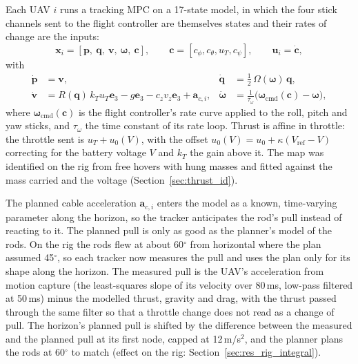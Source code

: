 Each UAV $i$ runs a tracking MPC on a 17-state model, in which the four stick channels sent to the
flight controller are themselves states and their rates of change are the inputs:
\begin{equation}
    \mathbf{x}_i = [\mathbf{p},\ \mathbf{q},\ \mathbf{v},\ \boldsymbol{\omega},\ \mathbf{c}], \qquad
    \mathbf{c} = [c_\phi, c_\theta, u_T, c_\psi], \qquad \mathbf{u}_i = \dot{\mathbf{c}},
\end{equation}
with
\begin{align}
    \dot{\mathbf{p}} &= \mathbf{v}, &
    \dot{\mathbf{q}} &= \tfrac{1}{2}\, \Omega(\boldsymbol{\omega})\, \mathbf{q}, \\
    \dot{\mathbf{v}} &= R(\mathbf{q})\, k_T u_T \mathbf{e}_3 - g\mathbf{e}_3 - c_z v_z \mathbf{e}_3 + \mathbf{a}_{c,i}, &
    \dot{\boldsymbol{\omega}} &= \frac{1}{\tau_\omega}\big(\boldsymbol{\omega}_{\mathrm{cmd}}(\mathbf{c}) - \boldsymbol{\omega}\big),
    \label{eq:trk_model}
\end{align}
where $\boldsymbol{\omega}_{\mathrm{cmd}}(\mathbf{c})$ is the flight controller's rate curve applied to the
roll, pitch and yaw sticks, and $\tau_\omega$ the time constant of its rate loop. Thrust is affine in
throttle: the throttle sent is $u_T + u_0(V)$, with the offset $u_0(V) = u_0 + \kappa (V_{\mathrm{ref}} - V)$
correcting for the battery voltage $V$ and $k_T$ the gain above it. The map was identified on the rig from free
hovers with hung masses and fitted against the mass carried and the voltage (Section~\ref{sec:thrust_id}).

The planned cable acceleration $\mathbf{a}_{c,i}$ enters the model as a known, time-varying parameter
along the horizon, so the tracker anticipates the rod's pull instead of reacting to it. The planned pull
is only as good as the planner's model of the rods. On the rig the rods flew at about 60$^\circ$ from
horizontal where the plan assumed 45$^\circ$, so each tracker now measures the pull and uses the plan only
for its shape along the horizon. The measured pull is the UAV's acceleration from motion capture (the
least-squares slope of its velocity over 80\,ms, low-pass filtered at 50\,ms) minus the modelled thrust,
gravity and drag, with the thrust passed through the same filter so that a throttle change does not read
as a change of pull. The horizon's planned pull is shifted by the difference between the measured and the
planned pull at its first node, capped at 12\,m/s$^2$, and the planner plans the rods at 60$^\circ$ to
match (effect on the rig: Section~\ref{sec:res_rig_integral}).

